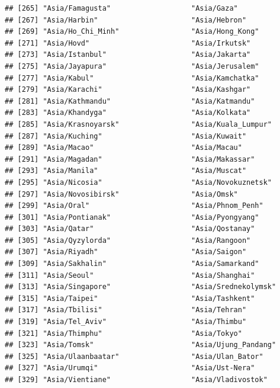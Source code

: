 \documentclass[
]{book}
\begin{document}
\begin{verbatim}
## [265] "Asia/Famagusta"                   "Asia/Gaza"                       
## [267] "Asia/Harbin"                      "Asia/Hebron"                     
## [269] "Asia/Ho_Chi_Minh"                 "Asia/Hong_Kong"                  
## [271] "Asia/Hovd"                        "Asia/Irkutsk"                    
## [273] "Asia/Istanbul"                    "Asia/Jakarta"                    
## [275] "Asia/Jayapura"                    "Asia/Jerusalem"                  
## [277] "Asia/Kabul"                       "Asia/Kamchatka"                  
## [279] "Asia/Karachi"                     "Asia/Kashgar"                    
## [281] "Asia/Kathmandu"                   "Asia/Katmandu"                   
## [283] "Asia/Khandyga"                    "Asia/Kolkata"                    
## [285] "Asia/Krasnoyarsk"                 "Asia/Kuala_Lumpur"               
## [287] "Asia/Kuching"                     "Asia/Kuwait"                     
## [289] "Asia/Macao"                       "Asia/Macau"                      
## [291] "Asia/Magadan"                     "Asia/Makassar"                   
## [293] "Asia/Manila"                      "Asia/Muscat"                     
## [295] "Asia/Nicosia"                     "Asia/Novokuznetsk"               
## [297] "Asia/Novosibirsk"                 "Asia/Omsk"                       
## [299] "Asia/Oral"                        "Asia/Phnom_Penh"                 
## [301] "Asia/Pontianak"                   "Asia/Pyongyang"                  
## [303] "Asia/Qatar"                       "Asia/Qostanay"                   
## [305] "Asia/Qyzylorda"                   "Asia/Rangoon"                    
## [307] "Asia/Riyadh"                      "Asia/Saigon"                     
## [309] "Asia/Sakhalin"                    "Asia/Samarkand"                  
## [311] "Asia/Seoul"                       "Asia/Shanghai"                   
## [313] "Asia/Singapore"                   "Asia/Srednekolymsk"              
## [315] "Asia/Taipei"                      "Asia/Tashkent"                   
## [317] "Asia/Tbilisi"                     "Asia/Tehran"                     
## [319] "Asia/Tel_Aviv"                    "Asia/Thimbu"                     
## [321] "Asia/Thimphu"                     "Asia/Tokyo"                      
## [323] "Asia/Tomsk"                       "Asia/Ujung_Pandang"              
## [325] "Asia/Ulaanbaatar"                 "Asia/Ulan_Bator"                 
## [327] "Asia/Urumqi"                      "Asia/Ust-Nera"                   
## [329] "Asia/Vientiane"                   "Asia/Vladivostok"                

\end{verbatim}
\end{document}
